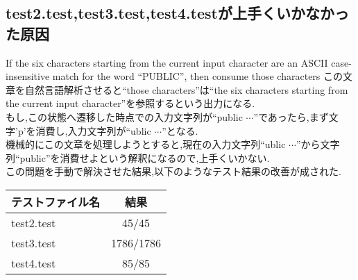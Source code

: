 \documentclass[uplatex,a4j]{jsreport}
\begin{document}
\subsection*{test2.test,test3.test,test4.testが上手くいかなかった原因}
If the six characters starting from the current input character are an ASCII case-insensitive match for the word ``PUBLIC'', then consume those characters
この文章を自然言語解析させると``those characters''は``the six characters starting from the current input character''を参照するという出力になる.\\
もし,この状態へ遷移した時点での入力文字列が``public $\cdots$''であったら,まず文字'p'を消費し,入力文字列が``ublic $\cdots$''となる.\\
機械的にこの文章を処理しようとすると,現在の入力文字列``ublic $\cdots$''から文字列``public''を消費せよという解釈になるので,上手くいかない.\\
この問題を手動で解決させた結果,以下のようなテスト結果の改善が成された.\\
\begin{table}[htb]
    \begin{tabular}{|l|c|} \hline
      テストファイル名 & 結果 \\ \hline 
      test2.test & 45/45 \\
      test3.test & 1786/1786 \\
      test4.test & 85/85 \\ \hline 
    \end{tabular}
\end{table}
\end{document}
